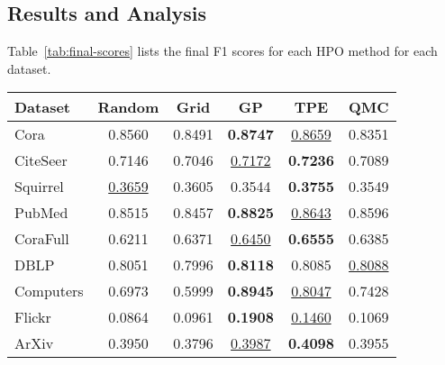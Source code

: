 \subsection{Results and Analysis}
Table~\ref{tab:final-scores} lists the final F1 scores for each HPO method for each dataset.

\begin{table*}
	\caption{Final F1 scores for each HPO method and for each dataset, averaged over 10 independent runs. The best method is \textbf{bold} and the second best is \underline{underlined}.}
	\label{tab:final-scores}
	\centering
	\begin{tabular}{lccccc}
		\toprule
		\textbf{Dataset} & \textbf{Random}    & \textbf{Grid} & \textbf{GP}        & \textbf{TPE}       & \textbf{QMC}       \\
		\midrule
		Cora             & 0.8560             & 0.8491        & \textbf{0.8747}    & \underline{0.8659} & 0.8351             \\
		CiteSeer         & 0.7146             & 0.7046        & \underline{0.7172} & \textbf{0.7236}    & 0.7089             \\
		Squirrel         & \underline{0.3659} & 0.3605        & 0.3544             & \textbf{0.3755}    & 0.3549             \\
		PubMed           & 0.8515             & 0.8457        & \textbf{0.8825}    & \underline{0.8643} & 0.8596             \\
		CoraFull         & 0.6211             & 0.6371        & \underline{0.6450} & \textbf{0.6555}    & 0.6385             \\
		DBLP             & 0.8051             & 0.7996        & \textbf{0.8118}    & 0.8085             & \underline{0.8088} \\
		Computers        & 0.6973             & 0.5999        & \textbf{0.8945}    & \underline{0.8047} & 0.7428             \\
		Flickr           & 0.0864             & 0.0961        & \textbf{0.1908}    & \underline{0.1460} & 0.1069             \\
		ArXiv            & 0.3950             & 0.3796        & \underline{0.3987} & \textbf{0.4098}    & 0.3955             \\
		\bottomrule
	\end{tabular}
\end{table*}
